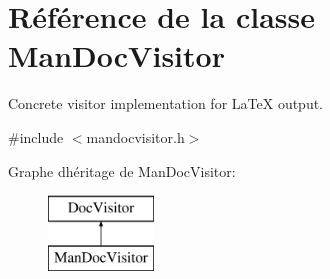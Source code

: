 \hypertarget{class_man_doc_visitor}{}\section{Référence de la classe Man\+Doc\+Visitor}
\label{class_man_doc_visitor}


Concrete visitor implementation for La\+Te\+X output.  




{\ttfamily \#include $<$mandocvisitor.\+h$>$}

Graphe d\textquotesingle{}héritage de Man\+Doc\+Visitor\+:\begin{figure}[H]
\begin{center}
\leavevmode
\includegraphics[height=2.000000cm]{class_man_doc_visitor}
\end{center}
\end{figure}
